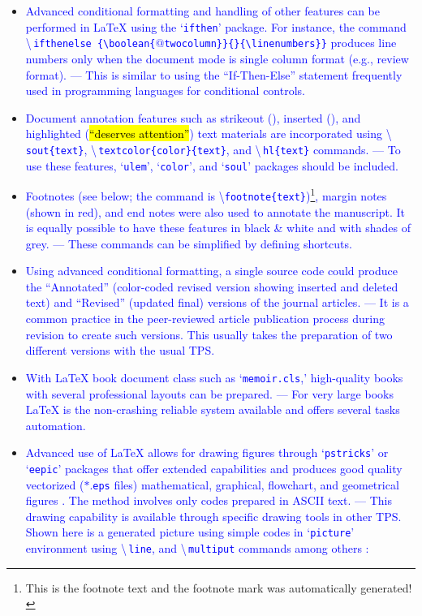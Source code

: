 \documentclass[phd,showgrids]{ndsu-thesis-2022}
\newcommand\italk[1]{\textcolor{blue}{#1}}  %
\newcommand\cmd[1]{\textbackslash\texttt{#1}}  %
\newcommand\lx{\LaTeX\xspace}
\newcommand\vb[1]{\textcolor{blue}{\texttt{#1}}}%
\newcommand\vbc[1]{\textcolor{blue}{\textbackslash\,\texttt{#1}}}%
\begin{document}
\begin{itemize}[leftmargin=*, itemsep=0pt, parsep=3pt]
\item \italk{Advanced conditional formatting and handling of other features can be performed in \lx using the `\vb{ifthen}' package. For instance, the command} \vbc{ifthenelse
\{\textbackslash boolean\{$@$twocolumn\}\}\{\}\{\textbackslash linenumbers\}\}} \italk{produces line numbers only when the document mode is single column format (e.g., review format). --- This is similar to using the ``If-Then-Else'' statement frequently used in programming languages for conditional controls.}   

\item \italk{Document annotation features such as strikeout (\dt{``deleted text''}), inserted (\nt{``newly added''}), and highlighted (\hl{``deserves attention''}) text materials are incorporated using \vbc{sout\{text\}}, \vbc{textcolor\{color\}\{text\}}, and \vbc{hl\{text\}} commands. --- To use these features, `\vb{ulem}', `\vb{color}', and `\vb{soul}' packages should be included.} 

\item \italk{Footnotes (see below; the command is \cmd{footnote\{text\}})\footnote{This is the footnote text and the footnote mark was automatically generated!}, margin notes {\marginpar{\scriptsize\textcolor{red}{This is margin note shown in color.}}} (shown in red), and end notes were also used to annotate the manuscript. It is equally possible to have these features in black \& white and with shades of grey. --- These commands can be simplified by defining shortcuts.} 

\item \italk{Using advanced conditional formatting, a single source code could produce the ``Annotated'' (color-coded revised version showing inserted and deleted text) and ``Revised'' (updated final) versions of the journal articles. --- It is a common practice in the peer-reviewed article publication process during revision to create such versions. This usually takes the preparation of two different versions with the usual TPS.}  

\item \italk{With \lx book document class such as `\vb{memoir.cls},' high-quality books with several professional layouts can be prepared. --- For very large books \lx is the non-crashing reliable system available and offers several tasks automation.}   

\item \italk{Advanced use of \lx allows for drawing figures through `\vb{pstricks}' or `\vb{eepic}' packages that offer extended capabilities and produces good quality vectorized ($\ast$.\vb{eps} files) mathematical, graphical, flowchart, and geometrical figures \citep{Goossens2008g}. The method involves only codes prepared in ASCII text. --- This drawing capability is available through specific drawing tools in other TPS. Shown here is a generated picture using simple codes in `\vb{picture}' environment using \vbc{line}, and \vbc{multiput} commands among others \citep{Kern2007a, Kern2007, Mittelbach2004}:}   


\end{itemize}
\end{document}
